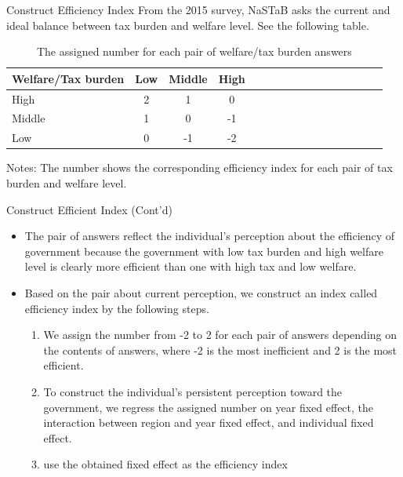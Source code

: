 \documentclass[
  ignorenonframetext,
]{beamer}
\providecommand{\tightlist}{%
  \setlength{\itemsep}{0pt}\setlength{\parskip}{0pt}}
\begin{document}
\begin{frame}{Construct Efficiency Index}
\protect\hypertarget{construct-efficiency-index}{}
From the 2015 survey, NaSTaB asks the current and ideal balance between tax burden and welfare level.
See the following table.

\begin{table}

\caption{\label{tab:efficientQ}The assigned number for each pair of welfare/tax burden answers}
\centering
\fontsize{8}{10}\selectfont
\begin{threeparttable}
\begin{tabular}[t]{l|cccl|cccl|cccl|ccc}
\toprule
Welfare/Tax burden & Low & Middle & High\\
\midrule
High & 2 & 1 & 0\\
Middle & 1 & 0 & -1\\
Low & 0 & -1 & -2\\
\bottomrule
\end{tabular}
\begin{tablenotes}
\item Notes: The number shows the corresponding efficiency index for each pair of tax burden and welfare level.
\end{tablenotes}
\end{threeparttable}
\end{table}
\end{frame}

\begin{frame}{Construct Efficient Index (Cont'd)}
\protect\hypertarget{construct-efficient-index-contd}{}
\begin{itemize}
\tightlist
\item
  The pair of answers reflect the individual's perception about the efficiency of government because the government with low tax burden and high welfare level is clearly more efficient than one with high tax and low welfare.
\item
  Based on the pair about current perception, we construct an index called efficiency index by the following steps.

  \begin{enumerate}
  \tightlist
  \item
    We assign the number from -2 to 2 for each pair of answers depending on the contents of answers, where -2 is the most inefficient and 2 is the most efficient.
  \item
    To construct the individual's persistent perception toward the government, we regress the assigned number on year fixed effect, the interaction between region and year fixed effect, and individual fixed effect.
  \item
    use the obtained fixed effect as the efficiency index
  \end{enumerate}
\end{itemize}
\end{frame}
\end{document}
